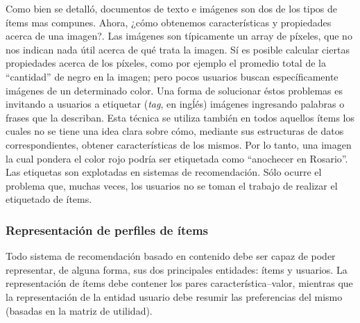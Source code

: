 			Como bien se detalló, documentos de texto e imágenes son dos de los tipos de ítems mas compunes. Ahora, ¿cómo obtenemos características y propiedades acerca de una imagen?. Las imágenes son típicamente un array de píxeles, que no nos indican nada útil acerca de qué trata la imagen. Sí es posible calcular ciertas propiedades acerca de los píxeles, como por ejemplo el promedio total de la \enquote{cantidad} de negro en la imagen; pero pocos usuarios buscan específicamente imágenes de un determinado color. Una forma de solucionar éstos problemas es invitando a usuarios a etiquetar (\textit{tag}, en ingĺés) imágenes ingresando palabras o frases que la describan. Esta técnica se utiliza también en todos aquellos ítems los cuales no se tiene una idea clara sobre cómo, mediante sus estructuras de datos correspondientes, obtener características de los mismos. Por lo tanto, una imagen la cual pondera el color rojo podría ser etiquetada como \enquote{anochecer en Rosario}. Las etiquetas son explotadas en sistemas de recomendación. Sólo ocurre el problema que, muchas veces, los usuarios no se toman el trabajo de realizar el etiquetado de ítems.
			
			\subsubsection{Representación de perfiles de ítems}
				Todo sistema de recomendación basado en contenido debe ser capaz de poder representar, de alguna forma, sus dos principales entidades: ítems y usuarios. La representación de ítems debe contener los pares característica--valor, mientras que la representación de la entidad usuario debe resumir las preferencias del mismo (basadas en la matriz de utilidad). \par
				
